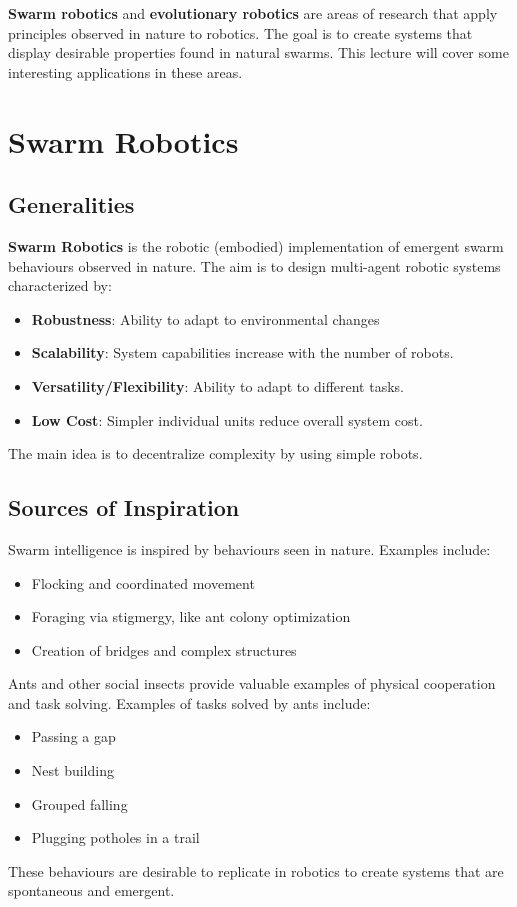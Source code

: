 \textbf{Swarm robotics} and \textbf{evolutionary robotics} are areas of research that apply principles observed in nature to robotics. The goal is to create systems that display desirable properties found in natural swarms. This lecture will cover some interesting applications in these areas.

\section{Swarm Robotics}
\subsection*{Generalities}
\textbf{Swarm Robotics} is the robotic (embodied) implementation of emergent swarm behaviours observed in nature. The aim is to design multi-agent robotic systems characterized by:
\begin{itemize}
    \item \textbf{Robustness}: Ability to adapt to environmental changes
    \item \textbf{Scalability}: System capabilities increase with the number of robots.
    \item \textbf{Versatility/Flexibility}: Ability to adapt to different tasks.
    \item \textbf{Low Cost}: Simpler individual units reduce overall system cost.
\end{itemize}
The main idea is to decentralize complexity by using simple robots.

\subsection*{Sources of Inspiration}
Swarm intelligence is inspired by behaviours seen in nature. Examples include:
\begin{itemize}
    \item Flocking and coordinated movement
    \item Foraging via stigmergy, like ant colony optimization
    \item Creation of bridges and complex structures
\end{itemize}
Ants and other social insects provide valuable examples of physical cooperation and task solving. Examples of tasks solved by ants include:
\begin{itemize}
    \item Passing a gap
    \item Nest building
    \item Grouped falling
    \item Plugging potholes in a trail
\end{itemize}
These behaviours are desirable to replicate in robotics to create systems that are spontaneous and emergent.

